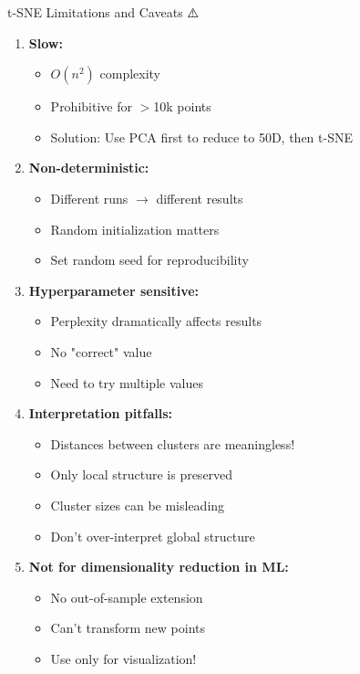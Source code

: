 \documentclass[aspectratio=169]{beamer}
\begin{document}
\begin{frame}[shrink=10]{t-SNE Limitations and Caveats ⚠️}
\begin{enumerate}\setlength{\itemsep}{0pt}
    \item \textbf{Slow:}
    \begin{itemize}\setlength{\itemsep}{0pt}
        \item $O(n^2)$ complexity
        \item Prohibitive for $>$10k points
        \item Solution: Use PCA first to reduce to 50D, then t-SNE
    \end{itemize}

    \item \textbf{Non-deterministic:}
    \begin{itemize}\setlength{\itemsep}{0pt}
        \item Different runs $\rightarrow$ different results
        \item Random initialization matters
        \item Set random seed for reproducibility
    \end{itemize}

    \item \textbf{Hyperparameter sensitive:}
    \begin{itemize}\setlength{\itemsep}{0pt}
        \item Perplexity dramatically affects results
        \item No "correct" value
        \item Need to try multiple values
    \end{itemize}

    \item \textbf{Interpretation pitfalls:}
    \begin{itemize}\setlength{\itemsep}{0pt}
        \item \alert{Distances between clusters are meaningless!}
        \item Only local structure is preserved
        \item Cluster sizes can be misleading
        \item Don't over-interpret global structure
    \end{itemize}

    \item \textbf{Not for dimensionality reduction in ML:}
    \begin{itemize}\setlength{\itemsep}{0pt}
        \item No out-of-sample extension
        \item Can't transform new points
        \item Use only for visualization!
    \end{itemize}
\end{enumerate}
\end{frame}
\end{document}
